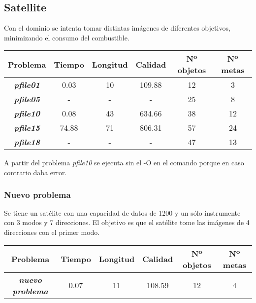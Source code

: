 \documentclass{uc3mpracticas}
\begin{document}
\subsection{Satellite}

Con el dominio se intenta tomar distintas imágenes de diferentes objetivos, minimizando el consumo del combustible.

\begin{center}
  \begin{tabular}{|c|c|c|c|c|c|}
    \hline
                  \textbf{Problema}       & \textbf{Tiempo} & \textbf{Longitud} & \textbf{Calidad} & \textbf{Nº objetos} & \textbf{Nº metas}\\ \hline \hline
        \textit{\textbf{pfile01}}         &  0.03           & 10                & 109.88           & 12                  & 3            \\ \hline
        \textit{\textbf{pfile05}}         &  -              & -                 & -                & 25                  & 8            \\ \hline
        \textit{\textbf{pfile10}}         & 0.08            & 43                & 634.66           & 38                  & 12           \\ \hline
        \textit{\textbf{pfile15}}         & 74.88           & 71                & 806.31           & 57                  & 24           \\ \hline
        \textit{\textbf{pfile18}}         & -               & -                 & -                & 47                  & 13           \\ \hline
  \end{tabular}
\end{center}

A partir del problema \textit{pfile10} se ejecuta sin el -O en el comando porque en caso contrario daba error.


\subsubsection*{Nuevo problema}

Se tiene un satélite con una capacidad de datos de 1200 y un sólo instrumente con 3 modos y 7 direcciones. El objetivo es que el satélite tome las imágenes de 4 direcciones con el primer modo.


\begin{center}
  \begin{tabular}{|c|c|c|c|c|c|}
    \hline
                  \textbf{Problema}       & \textbf{Tiempo} & \textbf{Longitud} & \textbf{Calidad} & \textbf{Nº objetos} & \textbf{Nº metas}\\ \hline \hline
        \textit{\textbf{nuevo problema}}  & 0.07            & 11                & 108.59           & 12                  & 4                \\ \hline
  \end{tabular}
\end{center}
\end{document}
